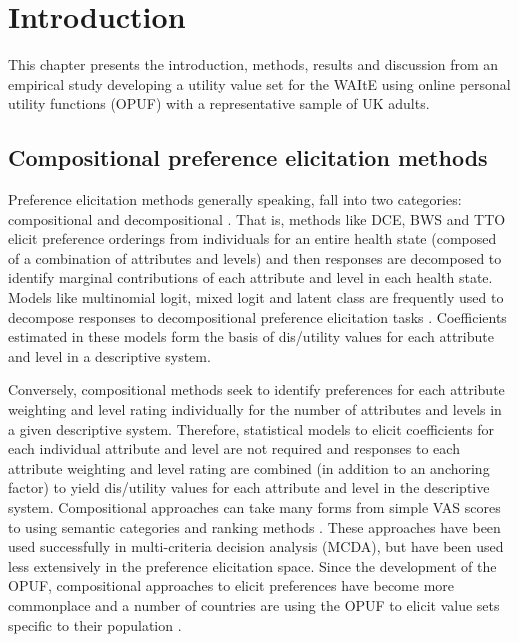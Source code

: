 \documentclass[
  number,
  preprint]{elsarticle}
\begin{document}
\section{Introduction}\label{sec-introduction}

This chapter presents the introduction, methods, results and discussion
from an empirical study developing a utility value set for the WAItE
using online personal utility functions (OPUF) with a representative
sample of UK adults.

\subsection{Compositional preference elicitation
methods}\label{compositional-preference-elicitation-methods}

Preference elicitation methods generally speaking, fall into two
categories: compositional and decompositional
\citep{Keeney1979DecisionsTrade-Offs, Marsh2016MultipleForce, Belton2002MultipleAnalysis}.
That is, methods like DCE, BWS and TTO elicit preference orderings from
individuals for an entire health state (composed of a combination of
attributes and levels) and then responses are decomposed to identify
marginal contributions of each attribute and level in each health state.
Models like multinomial logit, mixed logit and latent class are
frequently used to decompose responses to decompositional preference
elicitation tasks \citep{Hauber2016StatisticalForce}. Coefficients
estimated in these models form the basis of dis/utility values for each
attribute and level in a descriptive system.

Conversely, compositional methods seek to identify preferences for each
attribute weighting and level rating individually for the number of
attributes and levels in a given descriptive system. Therefore,
statistical models to elicit coefficients for each individual attribute
and level are not required and responses to each attribute weighting and
level rating are combined (in addition to an anchoring factor) to yield
dis/utility values for each attribute and level in the descriptive
system. Compositional approaches can take many forms from simple VAS
scores to using semantic categories and ranking methods
\citep{BanaECosta1999TheApplication, Danner2011IntegratingPreferences, Oliveira2018ValuingStates}.
These approaches have been used successfully in multi-criteria decision
analysis (MCDA), but have been used less extensively in the preference
elicitation space. Since the development of the OPUF, compositional
approaches to elicit preferences have become more commonplace and a
number of countries are using the OPUF to elicit value sets specific to
their population \citep{Brodszky2023PCR108States}.
\end{document}
